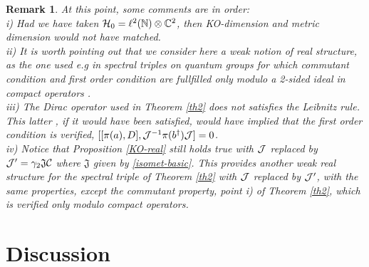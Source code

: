 \documentclass[a4paper]{jpconf}
\numberwithin{equation}{section}
\newtheorem{remark}[Theorem]{Remark}
\theoremstyle{nonumberplain}
\begin{document}
\begin{remark}\label{weak-struc} At this point, some comments are in order:\\
i) Had we have taken ${\cal{H}}_0=\ell^2(\mathbb{N})\otimes\mathbb{C}^2$, then KO-dimension and metric dimension would not have matched. \\
ii) It is worth pointing out that we consider here a weak notion of real structure, as the one used e.g in spectral triples on quantum groups for which commutant condition and first order condition are fullfilled only modulo a 2-sided ideal in compact operators \cite{weak-real}.\\
iii) The Dirac operator used in Theorem \ref{th2} does not satisfies the Leibnitz rule. This latter , if it would have been satisfied, would have implied that the first order condition is verified, $[[\pi(a),D],{\cal{J}}^{-1}\pi(b^\dag){\cal{J}}]=0$. \\
iv) Notice that Proposition \ref{KO-real} still holds true with ${\cal{J}}$ replaced by ${\cal{J}}^\prime=\gamma_2\mathfrak{J}{\cal{C}} $ where $\mathfrak{J}$ given by \eqref{isomet-basic}. This provides another weak real structure for the spectral triple of 
Theorem \ref{th2} with ${\cal{J}}$ replaced by ${\cal{J}}^\prime$, with the same properties, except the commutant property, point i) of Theorem \ref{th2}, which is verified only modulo compact operators.\\
\end{remark}


\section{Discussion}\label{discuss}
\end{document}
